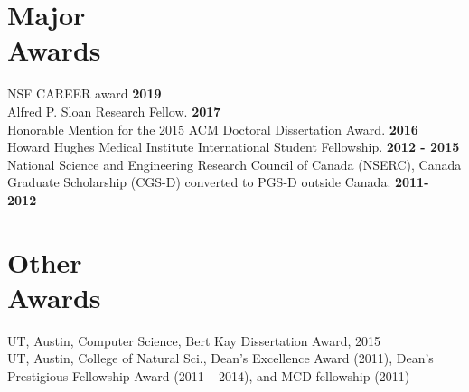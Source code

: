 \documentclass[margin,line,letterpaper]{resume}
\begin{document}
\begin{resume}

    \section{\mysidestyle Major \\Awards}
    NSF CAREER award \hfill \textbf{ 2019}\vspace{1mm}\\
    Alfred P. Sloan Research Fellow.\hfill \textbf{ 2017}\vspace{1mm}\\
    Honorable Mention for the 2015 ACM Doctoral Dissertation Award.\hfill \textbf{ 2016}\vspace{1mm}\\
     Howard Hughes Medical Institute International Student Fellowship. \hfill \textbf{2012 - 2015}\vspace{1mm}
     \\ National Science and Engineering Research Council of Canada (NSERC), 
     Canada Graduate Scholarship (CGS-D) converted to PGS-D outside Canada. \hfill \textbf{2011- 2012} 
     
     \section {\mysidestyle Other \\Awards}
     UT,  Austin, Computer Science, Bert Kay Dissertation Award, 2015\\
     UT,  Austin, College of Natural Sci., Dean's Excellence Award (2011), Dean's Prestigious Fellowship Award (2011 --  2014), and MCD fellowship (2011) %
    

\end{resume}
\end{document}
